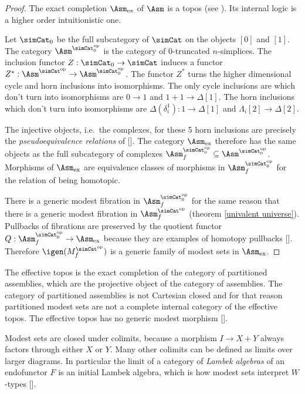 \documentclass{tac}
\newcommand\ri{^*}
\newcommand\dual{^{\mathrm{op}}}
\newcommand\s{^{\simCat\dual}}
\newcommand\of{:}
\newcommand\f{_f}
\newcommand\ex{_{\textrm{ex}}}
\newcommand\citep[1]{[\cite{#1}]}
\begin{document}
\begin{proof} The exact completion $\Asm\ex$ of $\Asm$ is a topos (see \cite{MR1981211}). Its internal logic is a higher order intuitionistic one. 

Let $\simCat_0$ be the full subcategory of $\simCat$ on the objects $[0]$ and $[1]$. The category $\Asm^{\simCat_0\dual}$ is the category of $0$-truncated $n$-simplices. The inclusion functor $Z\of \simCat_0\to\simCat$ induces a functor $Z\ri\of \Asm\s \to \Asm^{\simCat_0\dual}$. The functor $Z\ri$ turns the higher dimensional cycle and horn inclusions into isomorphisms. The only cycle inclusions are which don't turn into isomorphisms are $0\to 1$ and $1+1 \to \Delta[1]$. The horn inclusions which don't turn into isomorphisms are $\Delta(\delta^1_i)\of 1\to \Delta[1]$ and $\Lambda_i[2] \to \Delta[2]$.

The injective objects, i.e.\ the complexes, for these 5 horn inclusions are precisely the \emph{pseudoequivalence relations} of \citep{MR1600009}. The category $\Asm\ex$ therefore has the same objects as the full subcategory of complexes $\Asm^{\simCat_0\dual}\f\subseteq \Asm^{\simCat_0\dual}$. Morphisms of $\Asm\ex$ are equivalence classes of morphisms in $\Asm^{\simCat_0\dual}\f$ for the relation of being homotopic. 

There is a generic modest fibration in $\Asm^{\simCat_0\dual}\f$ for the same reason that there is a generic modest fibration in $\Asm\s\f$ (theorem \ref{univalent universe}). Pullbacks of fibrations are preserved by the quotient functor $Q\of \Asm^{\simCat_0\dual}\f \to\Asm\ex$ because they are examples of homotopy pullbacks \citep{GJSHT}. Therefore $\igen(M\s\f)$ is a generic family of modest sets in $\Asm\ex$.
\end{proof}

\begin{remark} The effective topos is the exact completion of the category of partitioned assemblies, which are the projective object of the category of assemblies. The category of partitioned assemblies is not Cartesian closed and for that reason partitioned modest sets are not a complete internal category of the effective topos. The effective topos has no generic modest morphism \citep{MR1023803}.
\end{remark}

\begin{remark}[Colimits] Modest sets are closed under colimits, because a morphism $I\to X+Y$ always factors through either $X$ or $Y$. Many other colimits can be defined as limits over larger diagrams. In particular the limit of a category of \emph{Lambek algebras} of an endofunctor $F$ is an initial Lambek algebra, which is how modest sets interpret $W$-types \citep{Freyd91}.
\end{remark}
\end{document}
